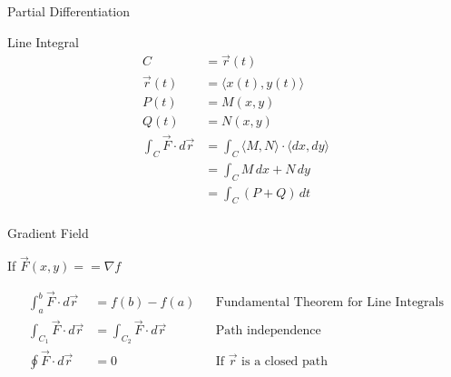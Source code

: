\begin{section}{Partial Differentiation}
  \begin{section}{Line Integral}
    \begin{align*}
      C &=\vec{r}(t) \\
      \vec{r}(t) &=\langle x(t),y(t) \rangle  \\
      P(t) &= M(x,y) \\
      Q(t) &= N(x,y) \\
      \int_C \vec{F} \cdot d\vec{r} &= \int_C \langle M,N \rangle \cdot \langle dx,dy \rangle \\
       &= \int_C M\,dx + N\,dy \\
       &= \int_C (P + Q) \,dt \\
    \end{align*}
  \end{section}

  \begin{section}{Gradient Field}

    If $\vec{F}(x,y) == \nabla{f}$

    \begin{align*}
      \int_a^b \vec{F} \cdot d\vec{r} &= f(b) - f(a) &&
      \text{Fundamental Theorem for Line Integrals}\\
      \int_{C_1} \vec{F} \cdot d\vec{r} &= \int_{C_2} \vec{F} \cdot d\vec{r} &&
      \text{Path independence}\\
      \oint \vec{F} \cdot d\vec{r} &= 0 &&
      \text{If $\vec{r}$ is a closed path}\\
    \end{align*}
  \end{section}



\end{section}
